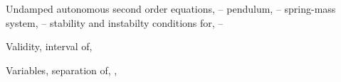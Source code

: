 \begin{tindex}

\item Undamped autonomous second order equations,
\pageref{eq:4.4.7}--\pageref{eq:4.4.23}
\subitem pendulum, \pageref{eq:4.4.26}--\pageref{eq:4.4.17}
\subitem spring-mass system, \pageref{eq:4.4.8}--\pageref{eq:4.4.12}
\subitem stability and instabilty conditions for,
\pageref{eq:4.4.18}--\pageref{eq:4.4.23}


\item Validity, interval of, \pageref{example:1.2.6}

\item Variables, separation of, \pageref{eq:2.1.16}, \pageref{eq:2.2.1}

\end{tindex}

